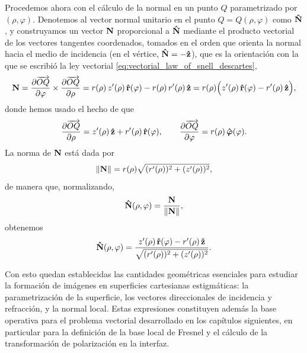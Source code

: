 Procedemos ahora con el cálculo de la normal en un punto $Q$ parametrizado por $(\rho, \varphi)$. Denotemos al vector normal unitario en el punto $Q=Q(\rho, \varphi)$ como $\bm{\hat{\mathbf{N}}}$, y construyamos un vector $\vb{N}$ proporcional a $\bm{\hat{\mathbf{N}}}$ mediante el producto vectorial de los vectores tangentes coordenados, tomados en el orden que orienta la normal hacia el medio de incidencia (en el vértice, $\bm{\hat{\mathbf{N}}} = -\bm{\hat{\mathbf{z}}}$), que es la orientación con la que se escribió la ley vectorial \eqref{eq:vectorial_law_of_snell_descartes},
\[
  \vb{N} = \frac{\partial \overrightarrow{OQ}}{\partial \varphi} \times \frac{\partial \overrightarrow{OQ}}{\partial \rho}
= r(\rho)\,z'(\rho)\,\bm{\hat{\mathbf{r}}}(\varphi)-r(\rho)\,r'(\rho)\,\bm{\hat{\mathbf{z}}}
= r(\rho)\Bigl(z'(\rho)\,\bm{\hat{\mathbf{r}}}(\varphi)-r'(\rho)\,\bm{\hat{\mathbf{z}}}\Bigr),
\]
donde hemos usado el hecho de que
\[
\frac{\partial \overrightarrow{OQ}}{\partial \rho}
= z'(\rho)\,\bm{\hat{\mathbf{z}}}+r'(\rho)\,\bm{\hat{\mathbf{r}}}(\varphi),
\qquad
\frac{\partial \overrightarrow{OQ}}{\partial \varphi}
= r(\rho)\,\bm{\hat{\mathbf{\varphi}}}(\varphi).
\]
La norma de $\vb{N}$ está dada por
\[
\|\vb{N}\|
= r(\rho)\sqrt{(r'(\rho))^2+(z'(\rho))^2},
\]
de manera que, normalizando,
\[
\bm{\hat{\mathbf{N}}}(\rho,\varphi)=\frac{\vb{N}}{\|\vb{N}\|},
\]
obtenemos
\begin{equation}
\bm{\hat{\mathbf{N}}}(\rho,\varphi) = \frac{z'(\rho)\,\bm{\hat{\mathbf{r}}}(\varphi)-r'(\rho)\,\bm{\hat{\mathbf{z}}}}{\sqrt{(r'(\rho))^2+(z'(\rho))^2}}.
  \label{eq:N_ovoid_rho_and_phi}
\end{equation}




Con esto quedan establecidas las cantidades geométricas esenciales para estudiar
la formación de imágenes en superficies cartesianas estigmáticas: la
parametrización de la superficie, los vectores direccionales de incidencia y
refracción, y la normal local. Estas expresiones constituyen además la base
operativa para el problema vectorial desarrollado en los capítulos siguientes,
en particular para la definición de la base local de Fresnel y el cálculo de la
transformación de polarización en la interfaz.

